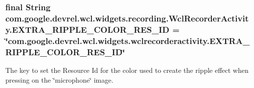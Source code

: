\subsubsection[{\texorpdfstring{E\+X\+T\+R\+A\+\_\+\+R\+I\+P\+P\+L\+E\+\_\+\+C\+O\+L\+O\+R\+\_\+\+R\+E\+S\+\_\+\+ID}{EXTRA_RIPPLE_COLOR_RES_ID}}]{\setlength{\rightskip}{0pt plus 5cm}final String com.\+google.\+devrel.\+wcl.\+widgets.\+recording.\+Wcl\+Recorder\+Activity.\+E\+X\+T\+R\+A\+\_\+\+R\+I\+P\+P\+L\+E\+\_\+\+C\+O\+L\+O\+R\+\_\+\+R\+E\+S\+\_\+\+ID = \char`\"{}com.\+google.\+devrel.\+wcl.\+widgets.\+wclrecorderactivity.\+E\+X\+T\+R\+A\+\_\+\+R\+I\+P\+P\+L\+E\+\_\+\+C\+O\+L\+O\+R\+\_\+\+R\+E\+S\+\_\+\+ID\char`\"{}\hspace{0.3cm}{\ttfamily [static]}}\hypertarget{classcom_1_1google_1_1devrel_1_1wcl_1_1widgets_1_1recording_1_1WclRecorderActivity_a4fc46389e5c23a882119e99b1b76e0b2}{}\label{classcom_1_1google_1_1devrel_1_1wcl_1_1widgets_1_1recording_1_1WclRecorderActivity_a4fc46389e5c23a882119e99b1b76e0b2}
The key to set the Resource Id for the color used to create the ripple effect when pressing on the \char`\"{}microphone\char`\"{} image. 
